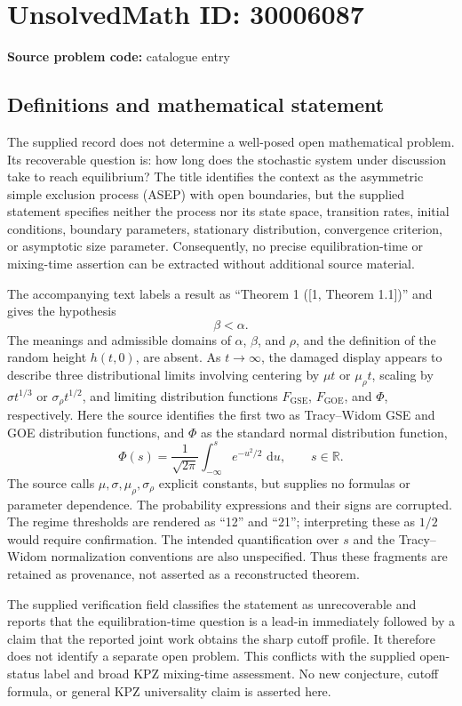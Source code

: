 \documentclass[11pt]{article}
\newcommand{\R}{\mathbb{R}}
\newcommand{\dd}{\,\mathrm{d}}
\begin{document}
\section*{UnsolvedMath ID: 30006087}
\textbf{Source problem code:} catalogue entry
\subsection{Definitions and mathematical statement}
The supplied record does not determine a well-posed open mathematical problem. Its recoverable question is: how long does the stochastic system under discussion take to reach equilibrium? The title identifies the context as the asymmetric simple exclusion process (ASEP) with open boundaries, but the supplied statement specifies neither the process nor its state space, transition rates, initial conditions, boundary parameters, stationary distribution, convergence criterion, or asymptotic size parameter. Consequently, no precise equilibration-time or mixing-time assertion can be extracted without additional source material.

The accompanying text labels a result as ``Theorem 1 ([1, Theorem 1.1])'' and gives the hypothesis
\[
\beta<\alpha.
\]
The meanings and admissible domains of \(\alpha\), \(\beta\), and \(\rho\), and the definition of the random height \(h(t,0)\), are absent. As \(t\to\infty\), the damaged display appears to describe three distributional limits involving centering by \(\mu t\) or \(\mu_\rho t\), scaling by \(\sigma t^{1/3}\) or \(\sigma_\rho t^{1/2}\), and limiting distribution functions \(F_{\mathrm{GSE}}\), \(F_{\mathrm{GOE}}\), and \(\Phi\), respectively. Here the source identifies the first two as Tracy--Widom GSE and GOE distribution functions, and \(\Phi\) as the standard normal distribution function,
\[
\Phi(s)=\frac{1}{\sqrt{2\pi}}\int_{-\infty}^{s}e^{-u^2/2}\,\dd u,
\qquad s\in\R.
\]
The source calls \(\mu,\sigma,\mu_\rho,\sigma_\rho\) explicit constants, but supplies no formulas or parameter dependence. The probability expressions and their signs are corrupted. The regime thresholds are rendered as ``12'' and ``21''; interpreting these as \(1/2\) would require confirmation. The intended quantification over \(s\) and the Tracy--Widom normalization conventions are also unspecified. Thus these fragments are retained as provenance, not asserted as a reconstructed theorem.

The supplied verification field classifies the statement as unrecoverable and reports that the equilibration-time question is a lead-in immediately followed by a claim that the reported joint work obtains the sharp cutoff profile. It therefore does not identify a separate open problem. This conflicts with the supplied open-status label and broad KPZ mixing-time assessment. No new conjecture, cutoff formula, or general KPZ universality claim is asserted here.
\end{document}

